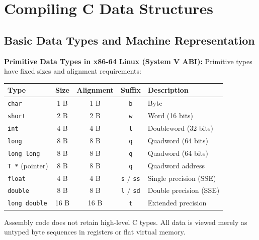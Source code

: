 \section{Compiling C Data Structures}

\subsection{Basic Data Types and Machine Representation}

\begin{definition}
    \textbf{Primitive Data Types in x86-64 Linux (System V ABI):} Primitive types have fixed sizes and alignment requirements:
    \begin{center}
        \renewcommand{\arraystretch}{1.15}
        \setlength{\tabcolsep}{6pt}
        \begin{tabular}{|l|c|c|c|l|}
            \hline
            \textbf{Type} & \textbf{Size} & \textbf{Alignment} & \textbf{Suffix} & \textbf{Description} \\
            \hline
            \texttt{char} & 1 B & 1 B & \texttt{b} & Byte \\
            \texttt{short} & 2 B & 2 B & \texttt{w} & Word (16 bits) \\
            \texttt{int} & 4 B & 4 B & \texttt{l} & Doubleword (32 bits) \\
            \texttt{long} & 8 B & 8 B & \texttt{q} & Quadword (64 bits) \\
            \texttt{long long} & 8 B & 8 B & \texttt{q} & Quadword (64 bits) \\
            \texttt{T *} (pointer) & 8 B & 8 B & \texttt{q} & Quadword address \\
            \texttt{float} & 4 B & 4 B & \texttt{s} / \texttt{ss} & Single precision (SSE) \\
            \texttt{double} & 8 B & 8 B & \texttt{l} / \texttt{sd} & Double precision (SSE) \\
            \texttt{long double} & 16 B & 16 B & \texttt{t} & Extended precision \\
            \hline
        \end{tabular}
    \end{center}
\end{definition}

\begin{important}
    Assembly code does not retain high-level C types. All data is viewed merely as untyped byte sequences in registers or flat virtual memory.
\end{important}

